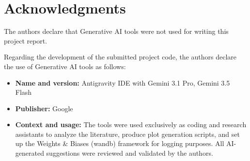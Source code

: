 \section*{Acknowledgments}

The authors declare that Generative AI tools were not used for writing this project report.

Regarding the development of the submitted project code, the authors declare the use of Generative AI tools as follows:

\begin{itemize}
    \item \textbf{Name and version:} Antigravity IDE with Gemini 3.1 Pro, Gemini 3.5 Flash
    \item \textbf{Publisher:} Google
    \item \textbf{Context and usage:} The tools were used exclusively as coding and research assistants to analyze the literature, 
    produce plot generation scripts, and set up the Weights \& Biases (wandb) framework for logging purposes. 
    All AI-generated suggestions were reviewed and validated by the authors.
\end{itemize}

